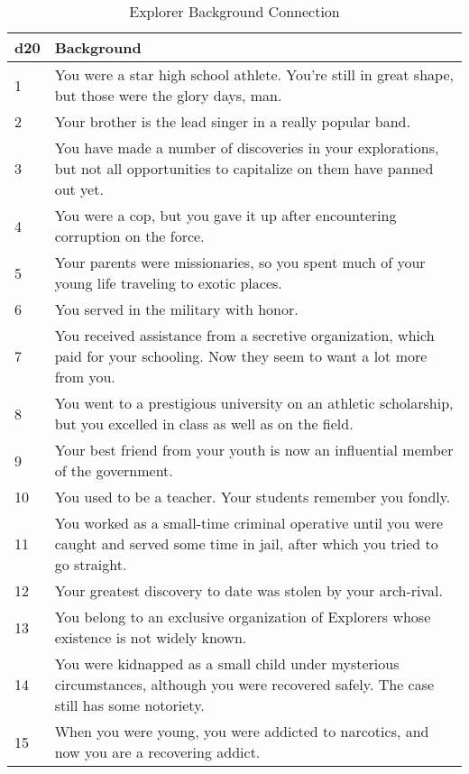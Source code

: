 \begin{multicols}{2}
\begin{table*}
\centering

\caption{Explorer Background Connection}
\label{tab:Explorer Background Connection}

\begin{tabularx}{\textwidth}{| p{} | p{} |}
\hline
\textbf{d20} & \textbf{Background} \\
\hline
1 & You were a star high school athlete. You’re still in great shape, but those were the glory days, man. \\ \hline
2 & Your brother is the lead singer in a really popular band. \\ \hline
3 & You have made a number of discoveries in your explorations, but not all opportunities to capitalize on them have panned out yet.  \\ \hline
4 & You were a cop, but you gave it up after encountering corruption on the force.  \\ \hline
5 & Your parents were missionaries, so you spent much of your young life traveling to exotic places. \\ \hline
6 & You served in the military with honor. \\ \hline
7 & You received assistance from a secretive organization, which paid for your schooling. Now they seem to want a lot more from you. \\ \hline
8 & You went to a prestigious university on an athletic scholarship, but you excelled in class as well as on the field.  \\ \hline
9 & Your best friend from your youth is now an influential member of the government.  \\ \hline
10 & You used to be a teacher. Your students remember you fondly. \\ \hline
11 & You worked as a small-time criminal operative until you were caught and served some time in jail, after which you tried to go straight. \\ \hline
12 & Your greatest discovery to date was stolen by your arch-rival. \\ \hline
13 & You belong to an exclusive organization of Explorers whose existence is not widely known. \\ \hline
14 & You were kidnapped as a small child under mysterious circumstances, although you were recovered safely. The case still has some notoriety. \\ \hline
15 & When you were young, you were addicted to narcotics, and now you are a recovering addict. \\ \hline

\end{tabularx}
\end{table*}
\end{multicols}
